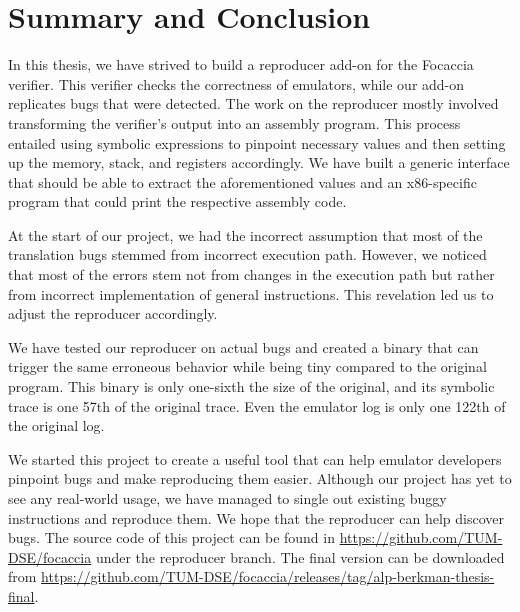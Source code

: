 
\chapter{Summary and Conclusion}\label{chapter:summary_and_conclusion}
In this thesis, we have strived to build a reproducer add-on for the Focaccia verifier.
This verifier checks the correctness of emulators, while our add-on replicates bugs that were detected.
The work on the reproducer mostly involved transforming the verifier's output into an assembly program.
This process entailed using symbolic expressions to pinpoint necessary values and then setting up the memory, stack, and registers accordingly.
We have built a generic interface that should be able to extract the aforementioned values and an x86-specific program that could print the respective assembly code.

At the start of our project, we had the incorrect assumption that most of the translation bugs stemmed from incorrect execution path.
However, we noticed that most of the errors stem not from changes in the execution path but rather from incorrect implementation of general instructions.
This revelation led us to adjust the reproducer accordingly.

We have tested our reproducer on actual bugs and created a binary that can trigger the same erroneous behavior while being tiny compared to the original program.
This binary is only one-sixth the size of the original, and its symbolic trace is one 57th of the original trace.
Even the emulator log is only one 122th of the original log.

We started this project to create a useful tool that can help emulator developers pinpoint bugs and make reproducing them easier.
Although our project has yet to see any real-world usage, we have managed to single out existing buggy instructions and reproduce them.
We hope that the reproducer can help discover bugs.
The source code of this project can be found in \url{https://github.com/TUM-DSE/focaccia} under the reproducer branch.
The final version can be downloaded from \url{https://github.com/TUM-DSE/focaccia/releases/tag/alp-berkman-thesis-final}.
